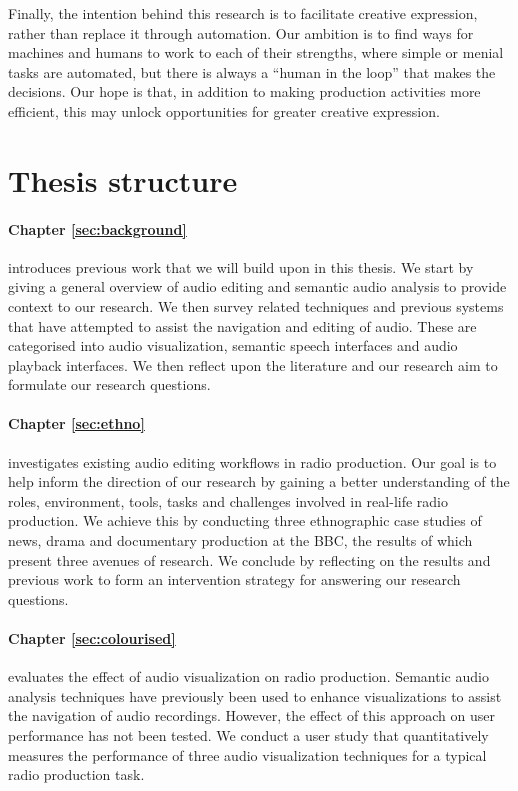 Finally, the intention behind this research is to facilitate creative expression, rather than replace it through
automation.  Our ambition is to find ways for machines and humans to work to each of their strengths, where simple or
menial tasks are automated, but there is always a ``human in the loop'' that makes the decisions.  Our hope is that, in
addition to making production activities more efficient, this may unlock opportunities for greater creative expression.

\section{Thesis structure}\label{sec:intro/structure}

\paragraph{Chapter \ref{sec:background}} introduces previous work that we will build upon in this thesis. We start by
giving a general overview of audio editing and semantic audio analysis to provide context to our research. We then
survey related techniques and previous systems that have attempted to assist the navigation and editing of audio. These
are categorised into audio visualization, semantic speech interfaces and audio playback interfaces. We then reflect
upon the literature and our research aim to formulate our research questions.

\paragraph{Chapter \ref{sec:ethno}} investigates existing audio editing workflows in radio production. Our goal is to
help inform the direction of our research by gaining a better understanding of the roles, environment, tools, tasks and
challenges involved in real-life radio production.  We achieve this by conducting three ethnographic case studies of
news, drama and documentary production at the BBC, the results of which present three avenues of research.  We conclude
by reflecting on the results and previous work to form an intervention strategy for answering our research questions.

\paragraph{Chapter \ref{sec:colourised}} evaluates the effect of audio visualization on radio production.  Semantic
audio analysis techniques have previously been used to enhance visualizations to assist the navigation of audio
recordings. However, the effect of this approach on user performance has not been tested.  We conduct a user study that
quantitatively measures the performance of three audio visualization techniques for a typical radio production task.

